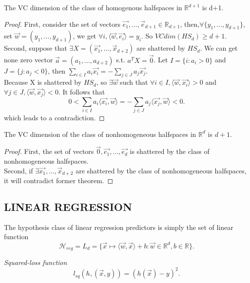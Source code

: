 \begin{thm}
	The VC dimension of the class of homogenous halfspaces in $\mathbb{R}^{d+1}$ is d+1.
\end{thm}
\begin{proof}
	First, consider the set of vectors $\vec{e_1}, \dots, \vec{e}_{d+1} \in \mathbb{R}_{d+1}$,
	then,$\forall \{y_1, \dots, y_{d+1} \}$, set $\vec{w} = (y_1, \dots, y_{d+1})$, we get
	$\forall i, \langle \vec{w}, \vec{e_i} \rangle = y_i$. So $VCdim(HS_d) \ge d+1$.\\
	Second, suppose that $\exists X = (\vec{x_1}, \dots, \vec{x}_{d+2})$ are shattered by $HS_d$.
	We can get none zero vector $\vec{a} = (a_1, \dots, a_{d+2})$ s.t. $a^TX = \vec{0}$.
	Let $I=\{ i : a_i > 0  \}$ and $J = \{ j : a_j < 0 \}$, then
	$\sum_{i \in I} a_i \vec{x_i} = -\sum_{j \in J} a_j \vec{x_j}$.\\
	Because X is shattered by $HS_d$, so $\exists \vec{w}$ such that 
	$\forall i \in I, \langle \vec{w}, \vec{x_i} \rangle > 0$ and
	$\forall j \in J, \langle \vec{w}, \vec{x_j} \rangle < 0$. It follows that
	\[
		0 < \sum\limits_{i\in I} a_i \langle \vec{x_i}, \vec{w} \rangle
		= -\sum\limits_{j \in J} a_j \langle \vec{x_j}, \vec{w} \rangle < 0
	.\]
	which leads to a contradiction.
\end{proof}

\begin{thm}
	The VC dimension of the class of nonhomogeneous halfspaces in $\mathbb{R}^d$ is $d+1$.
\end{thm}
\begin{proof}
	 First, the set of vectors $\vec{0},\vec{e_1},\dots,\vec{e_d}$ is shattered by the class
	 of nonhomogeneous halfspaces.\\
	 Second, if $\exists \vec{x_1}, \dots, \vec{x}_{d+2}$ are shattered by the class of
	 nonhomogeneous halfspaces, it will contradict former theorem.
\end{proof}

\subsection{LINEAR REGRESSION}

The hypothesis class of linear regression predictors is simply the set of linear function
\[
	\mathcal{H}_{reg} = L_d = \{ \vec{x}\mapsto \langle \vec{w}, \vec{x} \rangle + b :
	\vec{w} \in \mathbb{R}^d, b\in \mathbb{R}\}
.\]

\emph{Squared-loss function}
\[
	l_{sq}(h, (\vec{x},y)) = (h(\vec{x}) - y)^2
.\]


